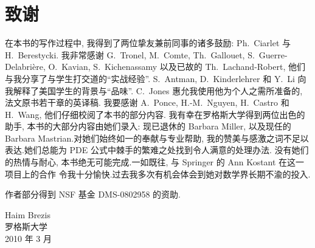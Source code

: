 \section*{致谢}

在本书的写作过程中, 我得到了两位挚友兼前同事的诸多鼓励: Ph.~Ciarlet 与 H.~Berestycki.
我非常感谢 G.~Tronel, M.~Comte, Th.~Gallouet, S.~Guerre-Delabrière, O.~Kavian, S.~Kichenassamy 以及已故的 Th.~Lachand-Robert, 他们与我分享了与学生打交道的``实战经验''.
S.~Antman, D.~Kinderlehrer 和 Y.~Li 向我解释了美国学生的背景与``品味''.
C.~Jones 惠允我使用他为个人之需所准备的, 法文原书若干章的英译稿.
我要感谢 A.~Ponce, H.-M.~Nguyen, H.~Castro 和 H.~Wang, 他们仔细校阅了本书的部分内容.
我有幸在罗格斯大学得到两位出色的助手, 本书的大部分内容由她们录入:
现已退休的 Barbara Miller, 以及现任的 Barbara Mastrian.对她们始终如一的奉献与专业帮助,
我的赞美与感激之词不足以表达.她们总能为 PDE 公式中棘手的繁难之处找到令人满意的处理办法.
没有她们的热情与耐心, 本书绝无可能完成.一如既往, 与 Springer 的 Ann Kostant 在这一项目上的合作
令我十分愉快.过去我多次有机会体会到她对数学界长期不渝的投入.

作者部分得到 NSF 基金 DMS-0802958 的资助.

\vspace{1.5\baselineskip}
\begin{flushright}
	Haim Brezis\\
	罗格斯大学\\
	2010 年 3 月
\end{flushright}

\cleardoublepage
